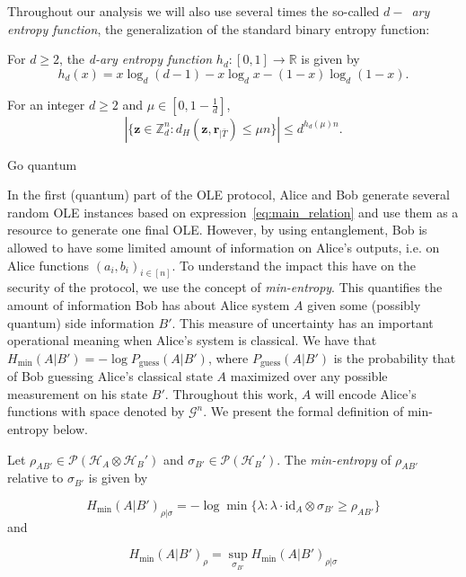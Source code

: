 Throughout our analysis we will also use several times the so-called $d-$~\textit{ary entropy function}, the generalization of the standard binary entropy function:
\begin{definition}

For $d\geq 2$, the \textit{d-ary entropy function} $h_d : [0,1]\rightarrow\mathbb{R}$ is given by
\begin{equation*}
    h_d(x) = x \log_d(d-1) - x \log_d x - (1-x) \log_d (1-x).
\end{equation*}
\label{def:q-ary}

\end{definition}

\begin{lemma}
\label{lemma:hammingBall}
For an integer $d\geq 2$ and $\mu \in [0, 1-\frac{1}{d}]$,
\begin{equation*}
    |\{ \boldsymbol{z}\in \mathbb{Z}_d^{n}: d_H(\boldsymbol{z}, \boldsymbol{r}_{|\bar{T}})\leq \mu n \}| \leq d^{h_d(\mu)n}.
\end{equation*}
\end{lemma} 


{\cv Go quantum}

In the first (quantum) part of the OLE protocol, Alice and Bob generate several random OLE instances based on expression~\eqref{eq:main_relation} and use them as a resource to generate one final OLE. However, by using entanglement, Bob is allowed to have some limited amount of information on Alice's outputs, i.e. on Alice functions $(a_i, b_i)_{i\in [n]}$. To understand the impact this have on the security of the protocol, we use the concept of \textit{min-entropy}. This quantifies the amount of information Bob has about Alice system $A$ given some (possibly quantum) side information $B'$. This measure of uncertainty has an important operational meaning when Alice's system is classical. We have that $H_{\text{min}}(A|B') = - \log P_{\text{guess}}(A|B')$, where $P_{\text{guess}}(A|B')$ is the probability that of Bob guessing Alice's classical state $A$ maximized over any possible measurement on his state $B'$. Throughout this work, $A$ will encode Alice's functions with space denoted by $\mathcal{G}^n$. We present the formal definition of min-entropy below.

\begin{definition}
Let $\rho_{A B'} \in \mathcal{P}(\mathcal{H}_A \otimes \mathcal{H}_B')$ and $\sigma_{B'} \in \mathcal{P}(\mathcal{H}_B')$. The \textit{min-entropy} of $\rho_{A B'}$ relative to $\sigma_{B'}$ is given by

$$H_{\text{min}}(A | B')_{\rho|\sigma} = -\log \min\{ \lambda : \lambda \cdot \text{id}_A \otimes \sigma_{B'} \geq \rho_{A B'} \}$$
and 

$$ H_{\text{min}}(A | B')_{\rho} = \sup_{\sigma_{B'}} H_{\text{min}}(A | B')_{\rho|\sigma} $$
\end{definition}





